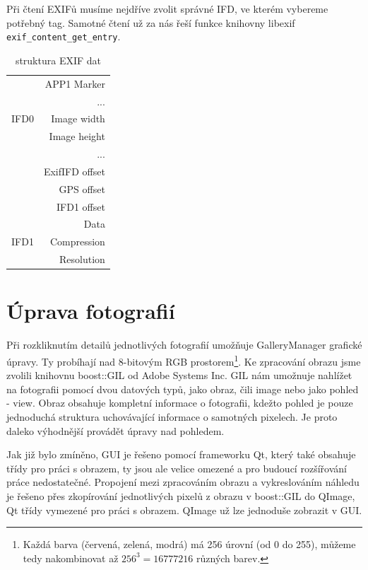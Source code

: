 \documentclass[11pt,twoside,a4paper]{book}
\begin{document}
\indent
Při čtení EXIFů musíme nejdříve zvolit správné IFD, ve kterém vybereme potřebný tag. Samotné čtení už za nás řeší funkce knihovny libexif \verb|exif_content_get_entry|.

\begin{table}
\begin{center}
\begin{tabular}{|l|r|}
\hline
& APP1 Marker\\
& ... \\
\hline
IFD0 & Image width \\
& Image height \\ 
& ... \\
& ExifIFD offset \\
& GPS offset \\ 
& IFD1 offset \\
& Data \\
\hline
IFD1 & Compression \\
& Resolution \\
\hline
\end{tabular}
\end{center}
\caption{struktura EXIF dat}
\label{tab:tabexif}
\end{table}

\section{Úprava fotografií}
\noindent
Při rozkliknutím detailů jednotlivých fotografií umožňuje GalleryManager grafické úpravy. Ty probíhají nad 8-bitovým RGB prostorem\footnote{Každá barva (červená, zelená, modrá) má 256 úrovní (od 0 do 255), můžeme tedy nakombinovat až $256^{3}=16777216$ různých barev.}. Ke zpracování obrazu jsme zvolili knihovnu boost::GIL\cite{boostgil} od Adobe Systems Inc. GIL nám umožnuje nahlížet na fotografii pomocí dvou datových typů, jako obraz, čili image nebo jako pohled - view. Obraz obsahuje kompletní informace o fotografii, kdežto pohled je pouze jednoduchá struktura uchovávající informace o samotných pixelech. Je proto daleko výhodnější provádět úpravy nad pohledem.

\indent
Jak již bylo zmíněno, GUI je řešeno pomocí frameworku Qt, který také obsahuje třídy pro práci s obrazem, ty jsou ale velice omezené a pro budoucí rozšířování práce nedostatečné. Propojení mezi zpracováním obrazu a vykreslováním náhledu je řešeno přes zkopírování jednotlivých pixelů z obrazu v boost::GIL do QImage, Qt třídy vymezené pro práci s obrazem. QImage už lze jednoduše zobrazit v GUI.
\end{document}
